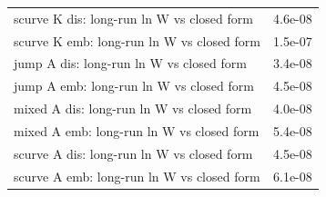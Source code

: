 \begin{tabular}{lc}
scurve K dis: long-run ln W vs closed form & 4.6e-08\\
scurve K emb: long-run ln W vs closed form & 1.5e-07\\
jump A dis: long-run ln W vs closed form & 3.4e-08\\
jump A emb: long-run ln W vs closed form & 4.5e-08\\
mixed A dis: long-run ln W vs closed form & 4.0e-08\\
mixed A emb: long-run ln W vs closed form & 5.4e-08\\
scurve A dis: long-run ln W vs closed form & 4.5e-08\\
scurve A emb: long-run ln W vs closed form & 6.1e-08\\
\bottomrule\end{tabular}
